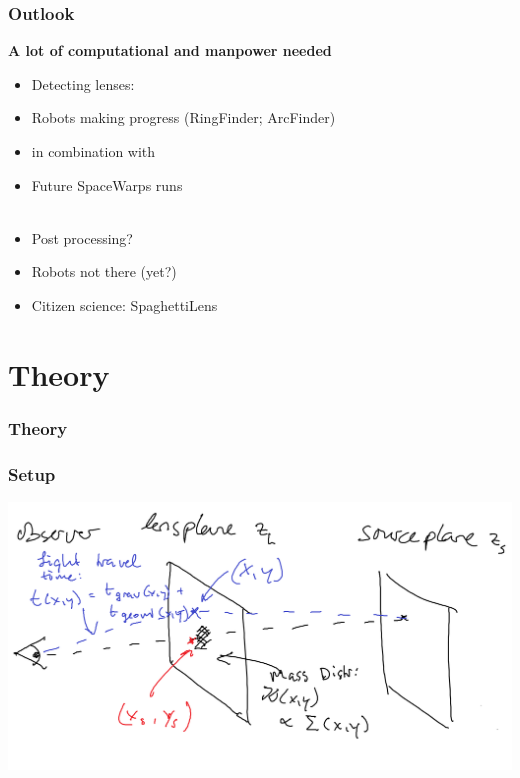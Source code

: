 \documentclass{beamer}
\newcommand{\aitem}{\item[$\Rightarrow$]}
\newcommand{\nitem}{\item[]}
\begin{document}
\begin{frame}
  \frametitle{Outlook}
	
	\textbf{A lot of computational and manpower needed}
	
  \begin{itemize}
			
		\nitem Detecting lenses:
		\item Robots making progress (RingFinder; ArcFinder)
		\nitem in combination with
		\item Future SpaceWarps runs \\~\\
		
		\nitem Post processing?
		\item Robots not there (yet?)
		\aitem Citizen science: SpaghettiLens

  \end{itemize}
\end{frame}




\section{Theory}
\begin{frame}
  \frametitle{Theory}

\end{frame}

\begin{frame}
	\frametitle{Setup}
	\includegraphics[width=\textwidth]{imgs/sketch_arrtime}
\end{frame}
\end{document}
